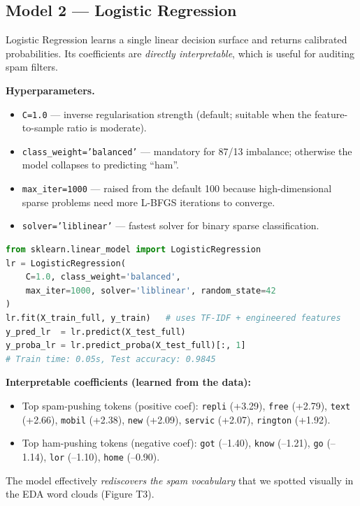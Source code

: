 \subsection{Model 2 --- Logistic Regression}

Logistic Regression learns a single linear decision surface and returns calibrated probabilities. Its coefficients are \emph{directly interpretable}, which is useful for auditing spam filters.

\textbf{Hyperparameters.}
\begin{itemize}
    \item \texttt{C=1.0} --- inverse regularisation strength (default; suitable when the feature-to-sample ratio is moderate).
    \item \texttt{class\_weight='balanced'} --- mandatory for 87/13 imbalance; otherwise the model collapses to predicting ``ham''.
    \item \texttt{max\_iter=1000} --- raised from the default 100 because high-dimensional sparse problems need more L-BFGS iterations to converge.
    \item \texttt{solver='liblinear'} --- fastest solver for binary sparse classification.
\end{itemize}

\begin{lstlisting}[language=Python]
from sklearn.linear_model import LogisticRegression
lr = LogisticRegression(
    C=1.0, class_weight='balanced',
    max_iter=1000, solver='liblinear', random_state=42
)
lr.fit(X_train_full, y_train)   # uses TF-IDF + engineered features
y_pred_lr  = lr.predict(X_test_full)
y_proba_lr = lr.predict_proba(X_test_full)[:, 1]
# Train time: 0.05s, Test accuracy: 0.9845
\end{lstlisting}

\textbf{Interpretable coefficients (learned from the data):}

\begin{itemize}
    \item Top spam-pushing tokens (positive coef): \texttt{repli} (+3.29), \texttt{free} (+2.79), \texttt{text} (+2.66), \texttt{mobil} (+2.38), \texttt{new} (+2.09), \texttt{servic} (+2.07), \texttt{rington} (+1.92).
    \item Top ham-pushing tokens (negative coef): \texttt{got} (--1.40), \texttt{know} (--1.21), \texttt{go} (--1.14), \texttt{lor} (--1.10), \texttt{home} (--0.90).
\end{itemize}

The model effectively \emph{rediscovers the spam vocabulary} that we spotted visually in the EDA word clouds (Figure T3).


